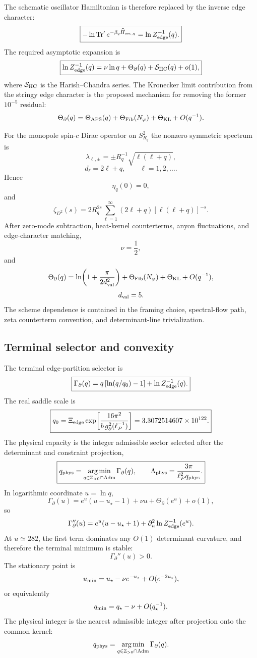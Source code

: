 \documentclass[aps,prd,reprint,nofootinbib,superscriptaddress,floatfix]{revtex4-2}
\numberwithin{equation}{section}
\theoremstyle{definition}
\theoremstyle{plain}
\begin{document}
The schematic oscillator Hamiltonian is therefore replaced by the inverse
edge character:
\[
\boxed{
-\ln\operatorname{Tr}'e^{-\beta_q\widehat H_{{\rm osc},q}}
=
\ln Z_{\rm edge}^{-1}(q).
}
\]
The required asymptotic expansion is
\[
\boxed{
\ln Z_{\rm edge}^{-1}(q)
=
\nu\ln q+\Theta_\partial(q)
+\mathcal S_{\rm HC}(q)+o(1),
}
\]
where \(\mathcal S_{\rm HC}\) is the Harish--Chandra series.  The Kronecker
limit contribution from the stringy edge character is the proposed mechanism
for removing the former \(10^{-5}\) residual:
\[
\Theta_\partial(q)
=
\Theta_{\rm APS}(q)
+\Theta_{\rm Fib}(N_\varphi)
+\Theta_{\rm KL}
+O(q^{-1}).
\]

For the monopole spin-\(c\) Dirac operator on \(S^2_{R_q}\) the nonzero
symmetric spectrum is
\[
\lambda_{\ell,\pm}
=
\pm R_q^{-1}\sqrt{\ell(\ell+q)},
\]
\[
d_\ell=2\ell+q,\qquad \ell=1,2,\ldots .
\]
Hence
\[
\eta_q(0)=0,
\]
and
\[
\zeta_{D^2}(s)
=
2R_q^{2s}
\sum_{\ell=1}^{\infty}
(2\ell+q)[\ell(\ell+q)]^{-s}.
\]
After zero-mode subtraction, heat-kernel counterterms, anyon fluctuations, and
edge-character matching,
\[
\nu=\frac12,
\]
and
\[
\Theta_\partial(q)
=
\ln\!\left(1+\frac{\pi}{2d_{\rm val}^2}\right)
+\Theta_{\rm Fib}(N_\varphi)
+\Theta_{\rm KL}
+O(q^{-1}),
\]
\[
d_{\rm val}=5.
\]
The scheme dependence is contained in the framing choice, spectral-flow path,
zeta counterterm convention, and determinant-line trivialization.

\subsection{Terminal selector and convexity}

The terminal edge-partition selector is
\[
\boxed{
\Gamma_\partial(q)
=
q\left[\ln(q/q_0)-1\right]
+
\ln Z_{\rm edge}^{-1}(q).
}
\]
The real saddle scale is
\[
\boxed{
q_0
=
\Xi_{\rm edge}
\exp\!\left[
\frac{16\pi^2}{b\,g_\partial^2(\ell_P^{-1})}
\right]
=
3.3072514607\times10^{122}.
}
\]
The physical capacity is the integer admissible sector selected after the
determinant and constraint projection,
\[
\boxed{
q_{\rm phys}
=
\operatorname*{arg\,min}_{q\in\mathbb Z_{>0}\cap{\rm Adm}}
\Gamma_\partial(q),
\qquad
\Lambda_{\rm phys}
=
\frac{3\pi}{\ell_P^2 q_{\rm phys}}.
}
\]
In logarithmic coordinate \(u=\ln q\),
\[
\Gamma_\partial(u)
=
e^u(u-u_\star-1)+\nu u+\Theta_\partial(e^u)+o(1),
\]
so
\[
\Gamma_\partial''(u)
=
e^u(u-u_\star+1)
+\partial_u^2\ln Z_{\rm edge}^{-1}(e^u).
\]
At \(u\simeq282\), the first term dominates any \(O(1)\) determinant curvature,
and therefore the terminal minimum is stable:
\[
\Gamma_\partial''(u)>0 .
\]
The stationary point is
\[
u_{\rm min}
=
u_\star-\nu e^{-u_\star}+O(e^{-2u_\star}),
\]
or equivalently
\[
q_{\rm min}=q_\star-\nu+O(q_\star^{-1}).
\]
The physical integer is the nearest admissible integer after projection onto
the common kernel:
\[
q_{\rm phys}
=
\operatorname*{arg\,min}_{q\in\mathbb Z_{>0}\cap{\rm Adm}}
\Gamma_\partial(q).
\]
\end{document}
